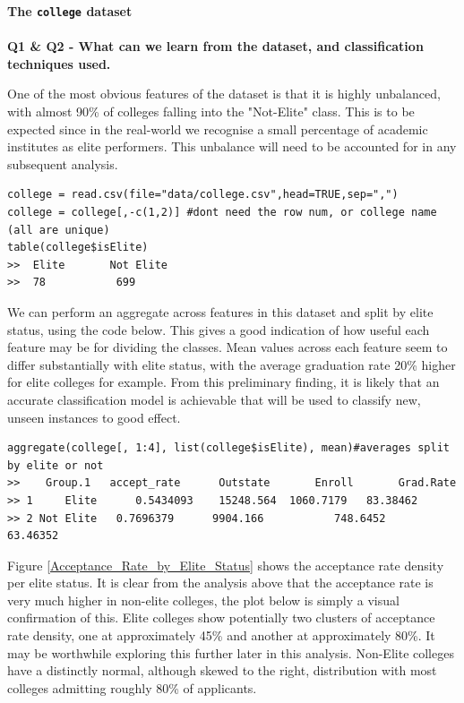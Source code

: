\documentclass[paper=a4, fontsize=11pt]{scrartcl} %
\begin{document}
{\noindent \bf \Large The \texttt{college} dataset}\\\\
{\noindent \bf \large Q1 \& Q2 - What can we learn from the dataset, and classification techniques used.}\\
{One of the most obvious features of the dataset is that it is highly unbalanced, with almost 90\% of colleges falling into the "Not-Elite" class. This is to be expected since in the real-world we recognise a small percentage of academic institutes as elite performers. This unbalance will need to be accounted for in any subsequent analysis. 
\begin{lstlisting}
college = read.csv(file="data/college.csv",head=TRUE,sep=",")
college = college[,-c(1,2)] #dont need the row num, or college name (all are unique)
table(college$isElite)
>>	Elite		Not Elite 
>>	78			 699 
\end{lstlisting}
{\par We can perform an aggregate across features in this dataset and split by elite status, using the code below. This gives a good indication of how useful each feature may be for dividing the classes. Mean values across each feature seem to differ substantially with elite status, with the average graduation rate 20\% higher for elite colleges for example. From this preliminary finding, it is likely that an accurate classification model is achievable that will be used to classify new, unseen instances to good effect.  
\begin{lstlisting}
aggregate(college[, 1:4], list(college$isElite), mean)#averages split by elite or not
>>    Group.1 	accept_rate 	 Outstate    	Enroll		 Grad.Rate
>> 1     Elite      0.5434093 	 15248.564 	1060.7179  	83.38462
>> 2 Not Elite   0.7696379  	9904.166  	       748.6452  	    63.46352
\end{lstlisting}
}
\clearpage
{\par Figure \ref{Acceptance_Rate_by_Elite_Status} shows the acceptance rate density per elite status. It is clear from the analysis above that the acceptance rate is very much higher in non-elite colleges, the plot below is simply a visual confirmation of this. Elite colleges show potentially two clusters of acceptance rate density, one at approximately 45\% and another at approximately 80\%. It may be worthwhile exploring this further later in this analysis. Non-Elite colleges have a distinctly normal, although skewed to the right, distribution with most colleges admitting roughly 80\% of applicants. 
\begin{lstlisting}

\end{lstlisting}}}
\end{document}
